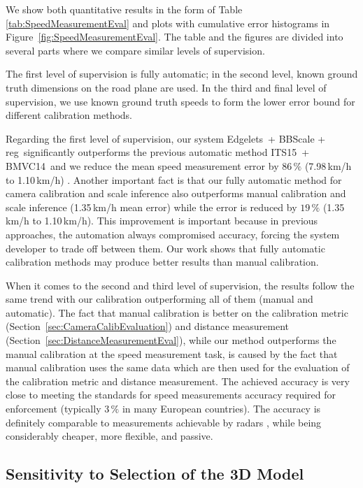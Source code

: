 \documentclass[]{elsarticle}
\newcommand{\ITSCalib}{ITS15}
\newcommand{\EdgeLetsCalib}{Edgelets}
\newcommand{\BMVCScale}{BMVC14}
\newcommand{\BBScaleReg}{BBScale + reg}
\begin{document}
We show both quantitative results in the form of Table \ref{tab:SpeedMeasurementEval} and plots with cumulative error histograms in Figure~\ref{fig:SpeedMeasurementEval}. The table and the figures are divided into several parts where we compare similar levels of supervision. 

The first level of supervision is fully automatic; in the second level, known ground truth dimensions on the road plane are used. In the third and final level of supervision, we use known ground truth speeds to form the lower error bound for different calibration methods. 

Regarding the first level of supervision, our system \EdgeLetsCalib\ + \BBScaleReg\ significantly outperforms the previous automatic method \ITSCalib\ + \BMVCScale\ and we reduce the mean speed measurement error by $86\,\%$ (7.98\,km/h to 1.10\,km/h) . Another important fact is that our fully automatic method for camera calibration and scale inference also outperforms manual calibration and scale inference (1.35\,km/h mean error) while the error is reduced by $19\,\%$ (1.35\,km/h to 1.10\,km/h). 
This improvement is important because in previous approaches, the automation always compromised  accuracy, forcing the system developer to trade off between them.  Our work shows that fully automatic calibration methods may produce better results than manual calibration.

When it comes to the second and third level of supervision, the results follow the same trend with our calibration outperforming all of them (manual and automatic). The fact that manual calibration is better on the calibration metric (Section~\ref{sec:CameraCalibEvaluation}) and distance measurement (Section~\ref{sec:DistanceMeasurementEval}), while our method outperforms the manual calibration at the speed measurement task, is caused by the fact that manual calibration uses the same data which are then used for the evaluation of the calibration metric and distance measurement. 
The achieved accuracy is very close to meeting the standards for speed measurements accuracy required for enforcement (typically $3\,\%$ in many European countries).  The accuracy is definitely comparable to measurements achievable by radars \citep{BrnoCompSpeed}, while being considerably cheaper, more flexible, and passive.




\subsection{Sensitivity to Selection of the 3D Model} \label{sec:SensitivityAnalysis}
\end{document}
